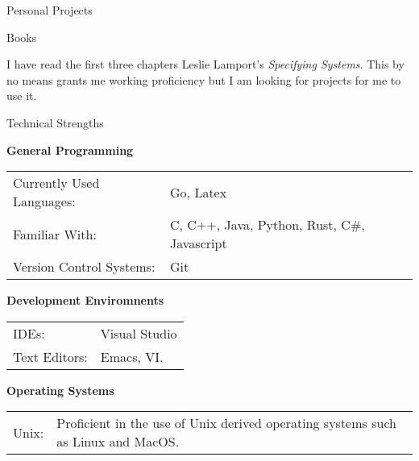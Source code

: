 \documentclass{resume} %
\newcommand{\btab}[2]{
	\bgroup
	\def\arraystretch{#1}
	\begin{tabular}{#2}
}
\newcommand{\etab}{
	\end{tabular} \smallskip
	\egroup
}
\begin{document}
\begin{rSection}{Personal Projects}


\begin{rSubsection}{Books}{}{}{}
	\item I have read the first three chapters Leslie Lamport's \textit{Specifying Systems}. This by no means grants me working proficiency but I am looking for projects for me to use it.
\end{rSubsection}

\end{rSection}


\begin{rSection}{Technical Strengths}

{\bf General Programming}

\btab{1.1}{ l l }
	Currently Used Languages: & Go, Latex \\
	Familiar With: & C, C++, Java, Python, Rust, C\#, Javascript \\
	Version Control Systems: & Git \\
\etab

{\bf Development Enviromnents}

\btab{1.1}{ l l }
	IDEs: & Visual Studio \\
	Text Editors: & Emacs, VI. \\
\etab

{\bf Operating Systems}

\btab{1.1}{ l l }
	Unix: & Proficient in the use of Unix derived operating systems such as Linux and MacOS. \\
\etab

\end{rSection}
\end{document}

